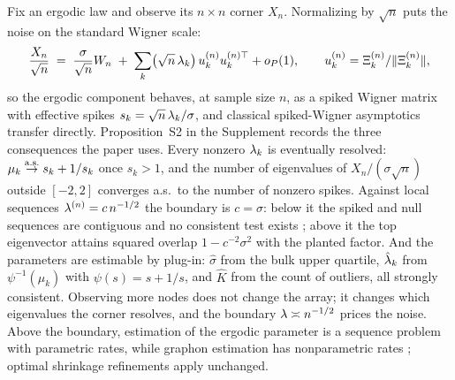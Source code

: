 Fix an ergodic law and observe its $n\times n$ corner $X_n$. Normalizing
by $\sqrt n$ puts the noise on the standard Wigner scale:
\[
\frac{X_n}{\sqrt n} \;=\; \frac{\sigma}{\sqrt n} W_n
\;+\;\sum_k \bigl(\sqrt n\,\lambda_k\bigr)\,u_k^{(n)}u_k^{(n)\top} + o_P(1),
\qquad u_k^{(n)} = \Xi_k^{(n)}/\lVert\Xi_k^{(n)}\rVert,
\]
so the ergodic component behaves, at sample size $n$, as a spiked Wigner
matrix with effective spikes $s_k=\sqrt n\,\lambda_k/\sigma$, and classical
spiked-Wigner asymptotics
\citep{feral2007largest,capitaine2009largest,benaych2011eigenvalues}
transfer directly. Proposition~S2 in the Supplement records the three
consequences the paper uses. Every nonzero $\lambda_k$ is eventually
resolved: $\mu_k\overset{\mathrm{a.s.}}{\to} s_k+1/s_k$ once $s_k>1$, and the number of
eigenvalues of $X_n/(\sigma\sqrt n)$ outside $[-2,2]$ converges a.s.\ to
the number of nonzero spikes. Against local sequences
$\lambda^{(n)}=c\,n^{-1/2}$ the boundary is $c=\sigma$: below it the spiked and null sequences are contiguous and no consistent test
exists \citep{onatski2013asymptotic,perry2018optimality};
above it the top eigenvector attains squared overlap $1-c^{-2}\sigma^2$
with the planted factor. And the parameters are estimable by plug-in:
$\hat\sigma$ from the bulk upper quartile, $\hat{\lambda}_k$ from
$\psi^{-1}(\mu_k)$ with $\psi(s)=s+1/s$, and $\hat K$ from the count of
outliers, all strongly consistent. Observing more nodes does not change
the array; it changes which eigenvalues the corner resolves, and the
boundary $\lambda\asymp n^{-1/2}$ prices the noise. Above the boundary,
estimation of the ergodic parameter is a sequence problem with parametric
rates, while graphon estimation has nonparametric rates
\citep{gao2015rate,klopp2017oracle}; optimal shrinkage refinements
\citep{donoho2018optimal} apply unchanged.
